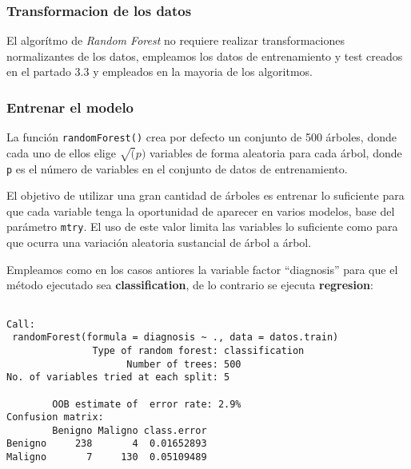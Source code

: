 \documentclass[
]{article}
\newenvironment{Shaded}{\begin{snugshade}}{\end{snugshade}}
\newcommand{\DataTypeTok}[1]{\textcolor[rgb]{0.13,0.29,0.53}{#1}}
\newcommand{\KeywordTok}[1]{\textcolor[rgb]{0.13,0.29,0.53}{\textbf{#1}}}
\newcommand{\NormalTok}[1]{#1}
\newcommand{\OperatorTok}[1]{\textcolor[rgb]{0.81,0.36,0.00}{\textbf{#1}}}
\newcommand{\StringTok}[1]{\textcolor[rgb]{0.31,0.60,0.02}{#1}}
\begin{document}
\hypertarget{transformacion-de-los-datos-2}{%
\subsubsection{Transformacion de los
datos}\label{transformacion-de-los-datos-2}}

El algorítmo de \emph{Random Forest} no requiere realizar
transformaciones normalizantes de los datos, empleamos los datos de
entrenamiento y test creados en el partado 3.3 y empleados en la mayoria
de los algoritmos.

\hypertarget{entrenar-el-modelo-5}{%
\subsubsection{Entrenar el modelo}\label{entrenar-el-modelo-5}}

La función \texttt{randomForest()} crea por defecto un conjunto de 500
árboles, donde cada uno de ellos elige \(\sqrt(p)\) variables de forma
aleatoria para cada árbol, donde \texttt{p} es el número de variables en
el conjunto de datos de entrenamiento.

El objetivo de utilizar una gran cantidad de árboles es entrenar lo
suficiente para que cada variable tenga la oportunidad de aparecer en
varios modelos, base del parámetro \texttt{mtry}. El uso de este valor
limita las variables lo suficiente como para que ocurra una variación
aleatoria sustancial de árbol a árbol.

Empleamos como en los casos antiores la variable factor ``diagnosis''
para que el método ejecutado sea \textbf{classification}, de lo
contrario se ejecuta \textbf{regresion}:

\begin{Shaded}
\end{Shaded}

\begin{verbatim}

Call:
 randomForest(formula = diagnosis ~ ., data = datos.train) 
               Type of random forest: classification
                     Number of trees: 500
No. of variables tried at each split: 5

        OOB estimate of  error rate: 2.9%
Confusion matrix:
        Benigno Maligno class.error
Benigno     238       4  0.01652893
Maligno       7     130  0.05109489
\end{verbatim}
\end{document}
